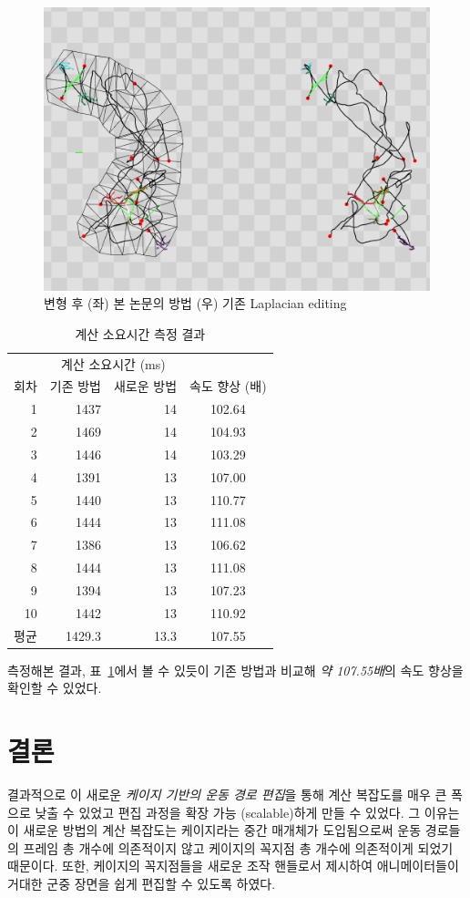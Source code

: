 \documentclass[12pt,a4paper,oneside,final]{report}
\begin{document}
\begin{figure}[p]
\centering
\includegraphics[width=0.9\linewidth]{after_deform_c.png}
\caption{변형 후 (좌) 본 논문의 방법 (우) 기존 Laplacian editing}
\label{fig:after_deform}
\end{figure}

\begin{table}[ht]
\centering
\begin{tabular}{r*{2}{r}c}
\hline
 & \multicolumn{2}{c}{계산 소요시간 (ms)} & \\
\cline{2-3}
회차 & 기존 방법 & 새로운 방법 & 속도 향상 (배) \\
\hline
1 & 1437 & 14 & 102.64 \\
2 & 1469 & 14 & 104.93 \\
3 & 1446 & 14 & 103.29 \\
4 & 1391 & 13 & 107.00 \\
5 & 1440 & 13 & 110.77 \\
6 & 1444 & 13 & 111.08 \\
7 & 1386 & 13 & 106.62 \\
8 & 1444 & 13 & 111.08 \\
9 & 1394 & 13 & 107.23 \\
10 & 1442 & 13 & 110.92 \\
\hline
평균 & 1429.3 & 13.3 & 107.55 \\
\hline
\end{tabular}
\caption{계산 소요시간 측정 결과}
\label{table:result}
\end{table}

측정해본 결과, 표~\ref{table:result}에서 볼 수 있듯이 기존 방법과 비교해 \emph{약
107.55배}의 속도 향상을 확인할 수 있었다.

\chapter{결론}
결과적으로 이 새로운 \emph{케이지 기반의 운동 경로 편집}을 통해 계산 복잡도를
매우 큰 폭으로 낮출 수 있었고 편집 과정을 확장 가능 (scalable)하게 만들 수
있었다. 그 이유는 이 새로운 방법의 계산 복잡도는 케이지라는 중간 매개체가
도입됨으로써 운동 경로들의 프레임 총 개수에 의존적이지 않고 케이지의 꼭지점 총
개수에 의존적이게 되었기 때문이다. 또한, 케이지의 꼭지점들을 새로운 조작
핸들로서 제시하여 애니메이터들이 거대한 군중 장면을 쉽게 편집할 수 있도록
하였다.
\end{document}
